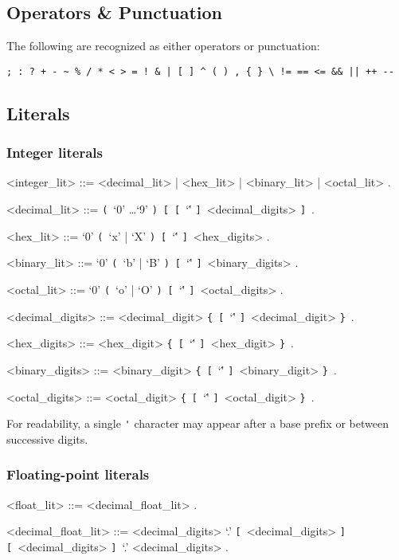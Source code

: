 \documentclass{article}
\def\lrep{\synshortsoff\texttt{\{}\synshorts~}
\def\rrep{\synshortsoff\texttt{\}}\synshorts~}
\def\lopt{\synshortsoff\texttt{[}\synshorts~}
\def\ropt{\synshortsoff\texttt{]}\synshorts~}
\def\lgrp{\synshortsoff\texttt{(}\synshorts~}
\def\rgrp{\synshortsoff\texttt{)}\synshorts~}
\begin{document}
\subsection*{Operators \& Punctuation}
The following are recognized as either operators or punctuation:
\begin{verbatim}
; : ? + - ~ % / * < > = ! & | [ ] ^ ( ) , { } \ != == <= && || ++ --
\end{verbatim}

\subsection*{Literals}
\subsubsection*{Integer literals}
\begin{grammar}
  <integer_lit> ::= <decimal_lit> | <hex_lit> | <binary_lit> | <octal_lit> .

  <decimal_lit> ::= \lgrp `0' \ldots `9' \rgrp \lopt \lopt `\'' \ropt <decimal_digits> \ropt .

  <hex_lit> ::= `0' \lgrp `x' | `X' \rgrp \lopt `\'' \ropt <hex_digits> .

  <binary_lit> ::= `0' \lgrp `b' | `B' \rgrp \lopt `\'' \ropt <binary_digits> .

  <octal_lit> ::= `0' \lgrp `o' | `O' \rgrp \lopt `\'' \ropt <octal_digits> .

  <decimal_digits> ::= <decimal_digit> \lrep \lopt `\'' \ropt <decimal_digit> \rrep .

  <hex_digits> ::= <hex_digit> \lrep \lopt `\'' \ropt <hex_digit> \rrep .

  <binary_digits> ::= <binary_digit> \lrep \lopt `\'' \ropt <binary_digit> \rrep .

  <octal_digits> ::= <octal_digit> \lrep \lopt `\'' \ropt <octal_digit> \rrep .
\end{grammar}

For readability, a single \texttt{\'} character may appear after a base prefix or between successive digits.

\subsubsection*{Floating-point literals}
\begin{grammar}
  <float_lit> ::= <decimal_float_lit> . %

  <decimal_float_lit> ::= <decimal_digits> `.' \lopt <decimal_digits> \ropt
  \alt \lopt <decimal_digits> \ropt `.' <decimal_digits> .

\end{grammar}
\end{document}
